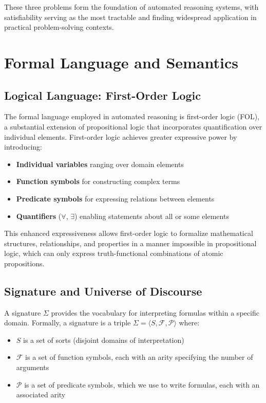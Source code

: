 \documentclass[11pt,a4paper]{article}
\theoremstyle{definition}
\theoremstyle{plain}
\theoremstyle{remark}
\begin{document}
These three problems form the foundation of automated reasoning systems, with satisfiability serving as the most tractable and finding widespread application in practical problem-solving contexts. 


\section{Formal Language and Semantics}

\subsection{Logical Language: First-Order Logic}

The formal language employed in automated reasoning is first-order logic (FOL), a substantial extension of propositional logic that incorporates quantification over individual elements. First-order logic achieves greater expressive power by introducing:

\begin{itemize}
    \item \textbf{Individual variables} ranging over domain elements
    \item \textbf{Function symbols} for constructing complex terms
    \item \textbf{Predicate symbols} for expressing relations between elements
    \item \textbf{Quantifiers} ($\forall$, $\exists$) enabling statements about all or some elements
\end{itemize}

This enhanced expressiveness allows first-order logic to formalize mathematical structures, relationships, and properties in a manner impossible in propositional logic, which can only express truth-functional combinations of atomic propositions.

\subsection{Signature and Universe of Discourse}

A signature $\Sigma$ provides the vocabulary for interpreting formulas within a specific domain. Formally, a signature is a triple $\Sigma = \langle S, \mathcal{F}, \mathcal{P} \rangle$ where:

\begin{itemize}
    \item $S$ is a set of sorts (disjoint domains of interpretation)
    \item $\mathcal{F}$ is a set of function symbols, each with an arity specifying the number of arguments
    \item $\mathcal{P}$ is a set of predicate symbols, which we use to write formulas, each with an associated arity
\end{itemize}
\end{document}
